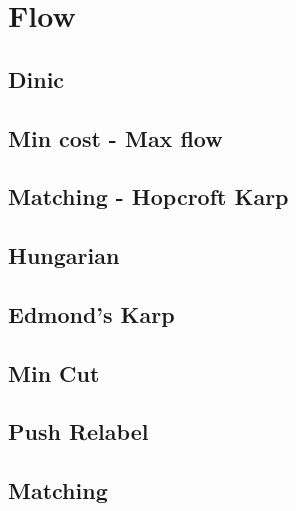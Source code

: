 \newpage
\section{Flow}
\subsection{Dinic}

\subsection{Min cost - Max flow}

\subsection{Matching - Hopcroft Karp}

\subsection{Hungarian}


\subsection{Edmond's Karp}

\subsection{Min Cut}

\subsection{Push Relabel}

\subsection{Matching}


